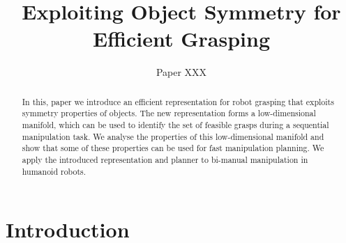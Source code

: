 \documentclass{aamas2015}
\begin{document}
\title{Exploiting Object Symmetry for Efficient Grasping}

\author{
\alignauthor
Paper XXX
}


\maketitle



\begin{abstract}
In this, paper we introduce an efficient representation for robot grasping that exploits symmetry
properties of objects. The new representation forms a low-dimensional manifold, which can be used to
identify the set of feasible grasps during a sequential manipulation task. We analyse the properties
of this low-dimensional manifold and show that some of these properties can be used for fast
manipulation planning. We apply the introduced representation and planner to bi-manual manipulation
in humanoid robots.
\end{abstract}


\section{Introduction}
\end{document}
